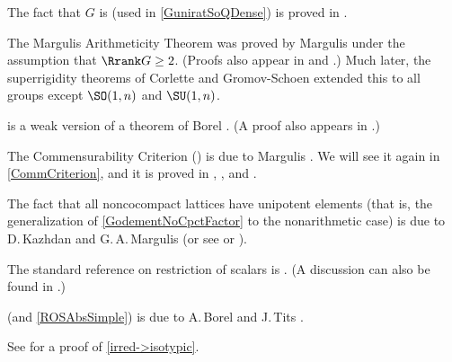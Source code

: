 \begin{notes}

The fact that $G$ is  (used in \cref{GuniratSoQDense}) is proved in \cite[Thm.~18.2, %
p.~218]{Borel-LinAlgGrps}.

The Margulis Arithmeticity Theorem  was
proved by Margulis \cite{MargulisArithProp, MargulisArith}
under the assumption that $\Rrank G \ge 2$. (Proofs also
appear in \cite[Thm.~A, p.~298]{MargulisBook} and
\cite{ZimmerBook}.) Much later, the superrigidity theorems
of Corlette \cite{Corlette} and Gromov-Schoen
\cite{GromovSchoen} extended this to all groups except
$\SO(1,n)$ and $\SU(1,n)$.

 is a weak version of a theorem of Borel \cite{Borel-CK}. (A proof also appears in \cite[Chap.~14]{RaghunathanBook}.)

The Commensurability Criterion () is due to Margulis \cite{Margulis-DiscGrpMot}. We will see it again in \cref{CommCriterion}, and it is proved in
\cite{A'CampoBurger}, \cite{MargulisBook}, and
\cite{ZimmerBook}.

The fact that all noncocompact lattices have unipotent elements (that is, the generalization of \cref{GodementNoCpctFactor} to the nonarithmetic case) is due to D.\,Kazhdan and G.\,A.\,Margulis \cite{KazhdanMargulis} (or see \cite{Borel-KazhdanMargulisBourbaki} or \cite[Cor.~11.13, p.~180]{RaghunathanBook}).

The standard reference on restriction of scalars is \cite[\S1.3, pp.~4--9]{Weil-AdelesAlgGrps}.
(A discussion can also be found in \cite[\S2.1.2, pp.~49--50]{PlatonovRapinchukBook}.)

 (and \cref{ROSAbsSimple}) is due to A.\,Borel and J.\,Tits \cite[6.21(ii), p.~113]{BorelTits-GrpRed}.

See \cite[Cor.~IX.4.5, p.~315]{MargulisBook} for a proof of \cref{irred->isotypic}.

\end{notes}




